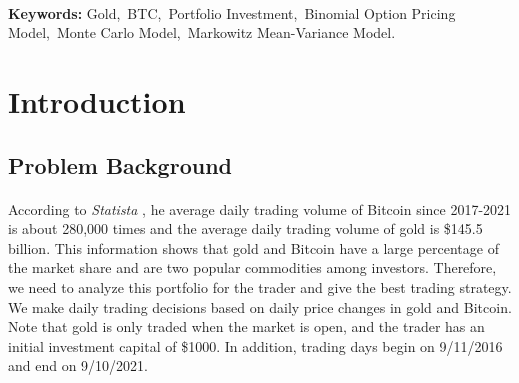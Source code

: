 \documentclass[12pt]{article}
\begin{document}
\paragraph{}
\textbf{Keywords:} Gold,\  BTC,\ Portfolio Investment,\  Binomial Option Pricing Model,\  Monte Carlo Model,\  Markowitz Mean-Variance Model.

\clearpage
\pagestyle{fancy}
\tableofcontents 
\newpage
\setcounter{page}{1}
\section{Introduction}
\subsection{Problem Background}
\paragraph{}
According to \emph{Statista} \cite{ref1}, he average daily trading volume of Bitcoin since 2017-2021 is about 280,000 times and the average daily trading volume of gold is \$145.5 billion. This information shows that gold and Bitcoin have a large percentage of the market share and are two popular commodities among investors. Therefore, we need to analyze this portfolio for the trader and give the best trading strategy. We make daily trading decisions based on daily price changes in gold and Bitcoin. Note that gold is only traded when the market is open, and the trader has an initial investment capital of \$1000. In addition, trading days begin on 9/11/2016 and end on 9/10/2021.
\end{document}
